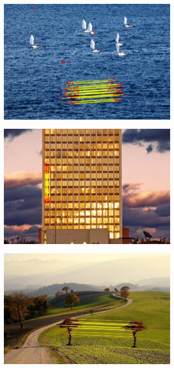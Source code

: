 \documentclass[12pt]{article}
\begin{document}
\begin{figure}
\centering
\begin{subfigure}{.5\textwidth}
  \centering
  \includegraphics[width=.8\linewidth]{./gfx/success_sailing.png}
\end{subfigure}%
\begin{subfigure}{.5\textwidth}
  \centering
  \includegraphics[width=.8\linewidth]{./gfx/knight.png}
\end{subfigure}
\begin{subfigure}{.5\textwidth}
  \centering
  \includegraphics[width=.8\linewidth]{../results/tree/sift_anms.jpg}

\end{subfigure}
\end{figure}
\end{document}
